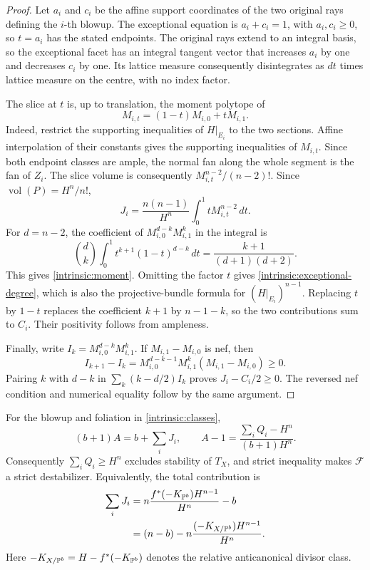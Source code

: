 \begin{proof}
Let $a_i$ and $c_i$ be the affine support coordinates of the two
original rays defining the $i$-th blowup. The exceptional equation is
$a_i+c_i=1$, with $a_i,c_i\ge0$, so $t=a_i$ has the stated endpoints.
The original rays extend to an integral basis, so the exceptional
facet has an integral tangent vector that increases $a_i$ by one and
decreases $c_i$ by one. Its lattice measure consequently disintegrates
as $dt$ times lattice measure on the centre, with no index factor.

The slice at $t$ is, up to translation, the moment polytope of
\[
 M_{i,t}=(1-t)M_{i,0}+tM_{i,1}.
\]
Indeed, restrict the supporting inequalities of $H|_{E_i}$ to the two
sections. Affine interpolation of their constants gives the supporting
inequalities of $M_{i,t}$. Since both endpoint classes are ample, the
normal fan along the whole segment is the fan of $Z_i$. The slice volume is consequently
$M_{i,t}^{n-2}/(n-2)!$. Since $\operatorname{vol}(P)=H^n/n!$,
\begin{equation}\label{intrinsic:beta-integral}
 J_i=\frac{n(n-1)}{H^n}\int_0^1tM_{i,t}^{n-2}\,dt.
\end{equation}
For $d=n-2$, the coefficient of $M_{i,0}^{d-k}M_{i,1}^k$ in the
integral is
\[
 \binom dk\int_0^1t^{k+1}(1-t)^{d-k}\,dt
 =\frac{k+1}{(d+1)(d+2)}.
\]
This gives \eqref{intrinsic:moment}. Omitting the factor $t$ gives
\eqref{intrinsic:exceptional-degree}, which is also the projective-bundle
formula for $(H|_{E_i})^{n-1}$. Replacing $t$ by $1-t$ replaces the
coefficient $k+1$ by $n-1-k$, so the two contributions sum to $C_i$.
Their positivity follows from ampleness.

Finally, write $I_k=M_{i,0}^{d-k}M_{i,1}^k$. If
$M_{i,1}-M_{i,0}$ is nef, then
\[
 I_{k+1}-I_k
 =M_{i,0}^{d-k-1}M_{i,1}^k(M_{i,1}-M_{i,0})\ge0.
\]
Pairing $k$ with $d-k$ in
$\sum_k(k-d/2)I_k$ proves $J_i-C_i/2\ge0$.
The reversed nef condition and numerical equality follow by the same
argument.
\end{proof}

\begin{theorem}\label{intrinsic:criterion}
For the blowup and foliation in \eqref{intrinsic:classes},
\begin{equation}\label{intrinsic:defect}
 (b+1)A=b+\sum_iJ_i,\qquad
 A-1=\frac{\sum_iQ_i-H^n}{(b+1)H^n}.
\end{equation}
Consequently $\sum_iQ_i\ge H^n$ excludes stability of $T_X$,
and strict inequality makes $\mathcal F$ a strict destabilizer.
Equivalently, the total contribution is
\begin{align}
 \sum_iJ_i
 &=n\frac{f^*(-K_{\mathbb{P}^b})H^{n-1}}{H^n}-b\notag\\
 &=(n-b)-n\frac{(-K_{X/\mathbb{P}^b})H^{n-1}}{H^n}.
 \label{intrinsic:relative-defect}
\end{align}
Here $-K_{X/\mathbb{P}^b}=H-f^*(-K_{\mathbb{P}^b})$ denotes the relative
anticanonical divisor class.
\end{theorem}

